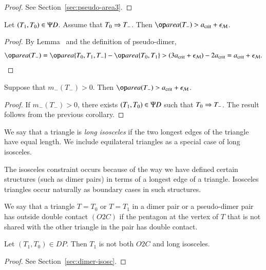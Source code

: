 \begin{proof} See Section~\ref{sec:pseudo-area3}.
\end{proof}


\begin{corollary} 
Let $(T_1,T_0)\in\Psi D$.  Assume that $T_0\Rightarrow T_-$.  Then
$\area(T_-) > \acrit+\epsM$.
\end{corollary}

\begin{proof}  
  By Lemma~ and the definition of pseudo-dimer,
\[
\area(T_-) = \area\{T_0,T_1,T_-\} - \area\{T_0,T_1\} 
> (3\acrit + \epsM) - 2\acrit = \acrit + \epsM.
\]
\end{proof}

\begin{corollary}
  Suppose that $m_-(T_-)>0$.  Then $\area(T_-) > \acrit + \epsM$.
\end{corollary}

\begin{proof} 
  If $m_-(T_-)>0$, there exists $(T_1,T_0)\in\Psi D$ such that $T_0\Rightarrow
  T_-$.  The result follows from the previous corollary.
\end{proof}


\begin{definition}
  We say that a triangle is {\it long isosceles} if the two longest edges of
  the triangle have equal length.  We include equilateral triangles as
  a special case of long isosceles.
\end{definition}

The isosceles constraint occurs because of the way we have defined
certain structures (such as dimer pairs) in terms of a longest edge of a
triangle.  Isosceles triangles occur naturally as boundary cases in
such structures.

\begin{definition}[O2C]
  We say that a triangle $T=T_0$ or $T=T_1$ in a dimer pair or a
  pseudo-dimer pair has outside double contact $(O2C)$ if the pentagon
  at the vertex of $T$ that is not shared with the other triangle in the
  pair has double contact.
\end{definition}

\begin{lemma}
  Let $(T_1,T_0)\in DP$.  Then $T_1$ is not both $O2C$ and long
  isosceles.
\end{lemma}

\begin{proof} See Section~\ref{sec:dimer-isosc}.
\end{proof}


